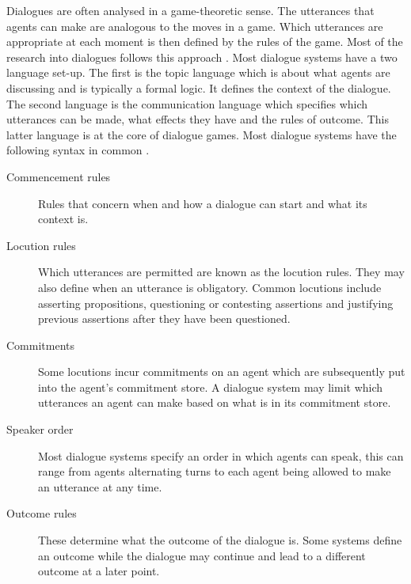 Dialogues are often analysed in a game-theoretic sense. The utterances
that agents can make are analogous to the moves in a game. Which utterances are
appropriate at each moment is then defined by the rules of the game. Most of
the research into dialogues follows this approach
\cite{prakken2006,prakken2009}. Most dialogue systems have a two language
set-up. The first is the topic language which is about what agents are
discussing and is typically a formal logic. It defines the context of the
dialogue. The second language is the communication language which specifies
which utterances can be made, what effects they have and the rules of outcome.
This latter language is at the core of dialogue games. Most dialogue systems
have the following syntax in common \cite{prakken2006,prakken2009,mcburney2009}.
\begin{description}
    \item[Commencement rules] Rules that concern when and how a dialogue can
    start and what its context is.
    \item[Locution rules] Which utterances are permitted are known as the
    locution rules. They may also define when an utterance is obligatory.
    Common locutions include asserting propositions, questioning or contesting
    assertions and justifying previous assertions after they have been
    questioned.
    \item[Commitments] Some locutions incur commitments on an agent which are
    subsequently put into the agent's commitment store. A dialogue system may
    limit which utterances an agent can make based on what is in its commitment
    store.
    \item[Speaker order] Most dialogue systems specify an order in which agents
    can speak, this can range from agents alternating turns to each agent being
    allowed to make an utterance at any time.
    \item[Outcome rules] These determine what the outcome of the dialogue is.
    Some systems define an outcome while the dialogue may continue and lead to
    a different outcome at a later point.
\end{description}

